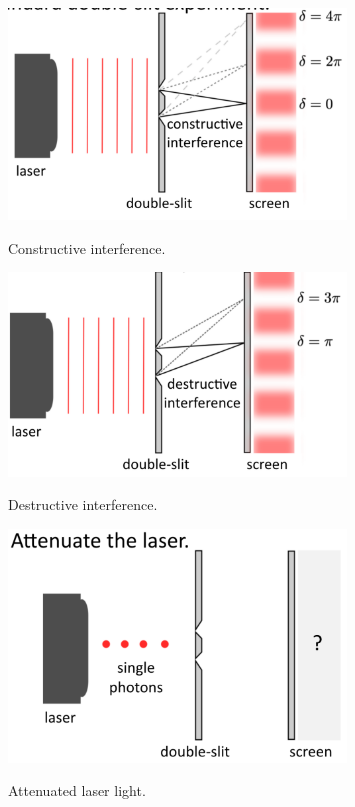 \begin{figure}[H]
   \centering
    \includegraphics[width=0.8\textwidth]{lesson6/double_slit_constructive.pdf}
    \label{fig: 1}
    
        \caption{Constructive interference.}
    
\end{figure}

\begin{figure}[H]
   \centering
    \includegraphics[width=0.8\textwidth]{lesson6/double_slit_destructive.pdf}
    \label{fig: 1}
    
        \caption{Destructive interference.}
    
\end{figure}

\begin{figure}[H]
   \centering
    \includegraphics[width=0.8\textwidth]{lesson6/attenuate_laser.pdf}
    \label{fig: 1}
    
        \caption{Attenuated laser light.}
    
\end{figure}

